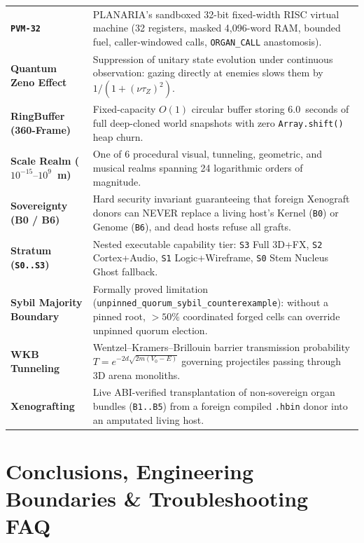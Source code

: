 \documentclass[10pt,letterpaper]{article}
\begin{document}
{\begin{longtable}{@{} L{3.9cm} L{13.1cm} @{}}
\textbf{\texttt{PVM-32}} & PLANARIA's sandboxed 32-bit fixed-width RISC virtual machine (32 registers, masked 4,096-word RAM, bounded fuel, caller-windowed calls, \texttt{ORGAN\_CALL} anastomosis). \\
\textbf{Quantum Zeno Effect} & Suppression of unitary state evolution under continuous observation: gazing directly at enemies slows them by $1/(1+(\nu\tau_Z)^2)$. \\
\textbf{RingBuffer (360-Frame)} & Fixed-capacity $O(1)$ circular buffer storing 6.0~seconds of full deep-cloned world snapshots with zero \texttt{Array.shift()} heap churn. \\
\textbf{Scale Realm ($10^{-15}\text{--}10^9$~m)} & One of 6 procedural visual, tunneling, geometric, and musical realms spanning 24 logarithmic orders of magnitude. \\
\textbf{Sovereignty (B0 / B6)} & Hard security invariant guaranteeing that foreign Xenograft donors can NEVER replace a living host's Kernel (\texttt{B0}) or Genome (\texttt{B6}), and dead hosts refuse all grafts. \\
\textbf{Stratum (\texttt{S0..S3})} & Nested executable capability tier: \texttt{S3} Full 3D+FX, \texttt{S2} Cortex+Audio, \texttt{S1} Logic+Wireframe, \texttt{S0} Stem Nucleus Ghost fallback. \\
\textbf{Sybil Majority Boundary} & Formally proved limitation (\texttt{unpinned\_quorum\_sybil\_counterexample}): without a pinned root, $>50\%$ coordinated forged cells can override unpinned quorum election. \\
\textbf{WKB Tunneling} & Wentzel--Kramers--Brillouin barrier transmission probability $T = e^{-2d\sqrt{2m(V_0-E)}}$ governing projectiles passing through 3D arena monoliths. \\
\textbf{Xenografting} & Live ABI-verified transplantation of non-sovereign organ bundles (\texttt{B1..B5}) from a foreign compiled \texttt{.hbin} donor into an amputated living host. \\
\bottomrule
\end{longtable}
}

\FloatBarrier
\section{Conclusions, Engineering Boundaries \& Troubleshooting FAQ}
\label{sec:conclusions}
\end{document}
